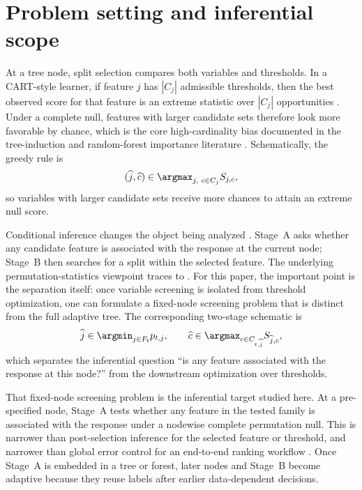 \section{Problem setting and inferential scope}
\label{sec:scope}

At a tree node, split selection compares both variables and thresholds. In a
CART-style learner, if feature $j$ has $|C_j|$ admissible thresholds, then the
best observed score for that feature is an extreme statistic over $|C_j|$
opportunities \citep{Breiman1984ClassificationAndRegressionTrees}. Under a
complete null, features with larger candidate sets therefore look more
favorable by chance, which is the core high-cardinality bias documented in the
tree-induction and random-forest importance literature
\citep{LohShih1997SplitSelectionMethods,Shih2004NoteOnSplitSelectionBiasClassificationTrees,KimLoh2001ClassificationTreesUnbiasedMultiwaySplits,Loh2002RegressionTreesUnbiasedVariableSelectionInteractionDetection,StroblBoulesteixAugustin2007UnbiasedSplitSelectionGini,Strobl2007BiasRFVariableImportance}.
Schematically, the greedy rule is
%
\begin{equation}
  (\widehat j,\widehat c) \in \argmax_{j,\ c \in C_j} S_{j,c},
\end{equation}
%
so variables with larger candidate sets receive more chances to attain an
extreme null score.

Conditional inference changes the object being analyzed
\citep{Hothorn2006UnbiasedRecursivePartitioning}. Stage~A asks whether any
candidate feature is associated with the response at the current node; Stage~B
then searches for a split within the selected feature. The underlying
permutation-statistics viewpoint traces to \citet{StrasserWeber1999PermutationStatistics}.
For this paper, the important point is the separation itself: once variable
screening is isolated from threshold optimization, one can formulate a
fixed-node screening problem that is distinct from the full adaptive tree.
The corresponding two-stage schematic is
%
\begin{equation}
  \widehat j \in \argmin_{j \in F_t} p_{t,j},
  \qquad
  \widehat c \in \argmax_{c \in C_{t,\widehat j}} S_{\widehat j,c},
\end{equation}
%
which separates the inferential question ``is any feature associated with the
response at this node?'' from the downstream optimization over thresholds.

That fixed-node screening problem is the inferential target studied here. At a
pre-specified node, Stage~A tests whether any feature in the tested family is
associated with the response under a nodewise complete permutation null. This
is narrower than post-selection inference for the selected feature or
threshold, and narrower than global error control for an end-to-end ranking
workflow \citep{Berk2013ValidPostSelectionInference,Lee2016ExactPostSelectionInferenceLasso,LeebPotscher2015ConfidenceIntervalsAfterModelSelection,BenjaminiHochberg1995FDR,BarberCandes2015Knockoffs,MeinshausenBuhlmann2010StabilitySelection}.
Once Stage~A is embedded in a tree or forest, later nodes and Stage~B become
adaptive because they reuse labels after earlier data-dependent decisions.

